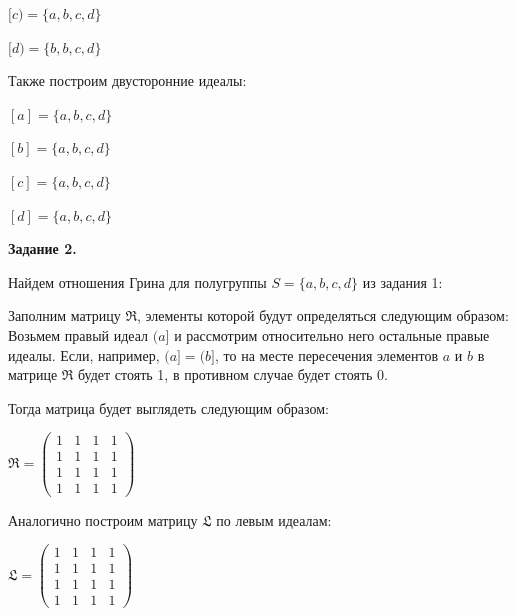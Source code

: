 \documentclass[spec, och, labwork]{shiza}
\begin{document}
\begin{enumerate}
\begin{center}
        $[c) = \{a, b, c, d\}$

        $[d) = \{b, b, c, d\}$
      \end{center}

      Также построим двусторонние идеалы:

      \begin{center}
      
        $[a] = \{a, b, c, d\}$

        $[b] = \{a, b, c, d\}$

        $[c] = \{a, b, c, d\}$

        $[d] = \{a, b, c, d\}$
        
      \end{center}


    \end{enumerate}
    
    
    \textbf{Задание 2.}
    
    Найдем отношения Грина для полугруппы $S = \{a, b, c, d\}$ из задания 1:

    Заполним матрицу $\mathfrak{R}$, элементы которой будут определяться следующим образом: Возьмем правый идеал $(a]$ и рассмотрим относительно
    него остальные правые идеалы. Если, например, $(a] = (b]$, то на месте пересечения элементов $a$ и $b$ в матрице $\mathfrak{R}$ будет стоять 1,
    в противном случае будет стоять 0.

    Тогда матрица будет выглядеть следующим образом:

    \begin{center}
      $\mathfrak{R} =
      \begin{pmatrix}
        1 & 1 & 1 & 1 \\
        1 & 1 & 1 & 1 \\
        1 & 1 & 1 & 1 \\
        1 & 1 & 1 & 1
      \end{pmatrix}$
    \end{center}
    
    Аналогично построим матрицу $\mathfrak{L}$ по левым идеалам:

    \begin{center}
      $\mathfrak{L} =
      \begin{pmatrix}
        1 & 1 & 1 & 1 \\
        1 & 1 & 1 & 1 \\
        1 & 1 & 1 & 1 \\
        1 & 1 & 1 & 1
      \end{pmatrix}$
    \end{center}
    
\end{document}
